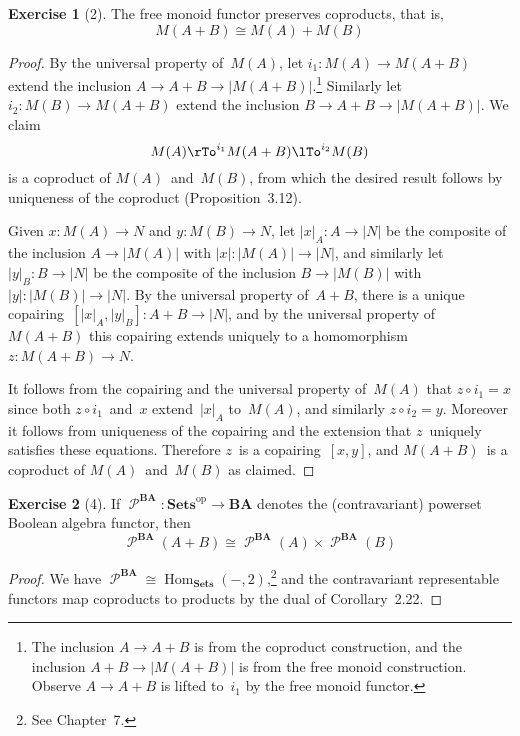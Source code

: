 \documentclass[letterpaper,12pt]{article}
\newcommand{\iso}{\cong}
\newcommand{\after}{\circ}
\DeclareMathOperator{\Hom}{Hom}
\DeclareMathOperator{\pow}{\mathcal{P}}
\newcommand{\copair}[2]{[{#1},{#2}]}
\newcommand{\cat}[1]{\mathbf{#1}}
\newcommand{\dual}[1]{#1^{\mathrm{op}}}
\newcommand{\under}[1]{|{#1}|}
\newcommand{\2}{\cat{2}}
\newcommand{\Sets}{\cat{Sets}}
\newcommand{\Setsop}{\dual{\Sets}}
\newcommand{\BA}{\cat{BA}}
\newcommand{\powBA}{\pow^{\BA}}
\theoremstyle{definition}
\newtheorem*{exer}{Exercise}
\theoremstyle{remark}
\theoremstyle{direction}
\begin{document}
\begin{exer}[2]
The free monoid functor preserves coproducts, that is,
\[M(A+B)\iso M(A)+M(B)\]
\end{exer}
\begin{proof}
By the universal property of~\(M(A)\), let \(i_1:M(A)\to M(A+B)\) extend the inclusion \(A\to A+B\to\under{M(A+B)}\).\footnote{The inclusion \(A\to A+B\) is from the coproduct construction, and the inclusion \(A+B\to\under{M(A+B)}\) is from the free monoid construction. Observe \(A\to A+B\) is lifted to~\(i_1\) by the free monoid functor.} Similarly let \(i_2:M(B)\to M(A+B)\) extend the inclusion \(B\to A+B\to\under{M(A+B)}\). We claim
\[M(A)\rTo^{i_1}M(A+B)\lTo^{i_2}M(B)\]
is a coproduct of \(M(A)\)~and~\(M(B)\), from which the desired result follows by uniqueness of the coproduct (Proposition~3.12).

Given \(x:M(A)\to N\) and \(y:M(B)\to N\), let \(\under{x}_A:A\to\under{N}\) be the composite of the inclusion \(A\to\under{M(A)}\) with \(\under{x}:\under{M(A)}\to\under{N}\), and similarly let \(\under{y}_B:B\to\under{N}\) be the composite of the inclusion \(B\to\under{M(B)}\) with \(\under{y}:\under{M(B)}\to\under{N}\). By the universal property of~\(A+B\), there is a unique copairing~\(\copair{\under{x}_A}{\under{y}_B}:A+B\to\under{N}\), and by the universal property of~\(M(A+B)\) this copairing extends uniquely to a homomorphism \(z:M(A+B)\to N\).

It follows from the copairing and the universal property of~\(M(A)\) that \(z\after i_1=x\) since both \(z\after i_1\)~and~\(x\) extend~\(\under{x}_A\) to~\(M(A)\), and similarly \(z\after i_2=y\). Moreover it follows from uniqueness of the copairing and the extension that \(z\)~uniquely satisfies these equations. Therefore \(z\)~is a copairing~\(\copair{x}{y}\), and \(M(A+B)\)~is a coproduct of \(M(A)\)~and~\(M(B)\) as claimed.
\end{proof}

\begin{exer}[4]
If \(\powBA:\Setsop\to\BA\) denotes the (contravariant) powerset Boolean algebra functor, then
\[\powBA(A+B)\iso\powBA(A)\times\powBA(B)\]
\end{exer}
\begin{proof}
We have \(\powBA\iso\Hom_{\Sets}(-,2)\),\footnote{See Chapter~7.} and the contravariant representable functors map coproducts to products by the dual of Corollary~2.22.
\end{proof}
\end{document}
